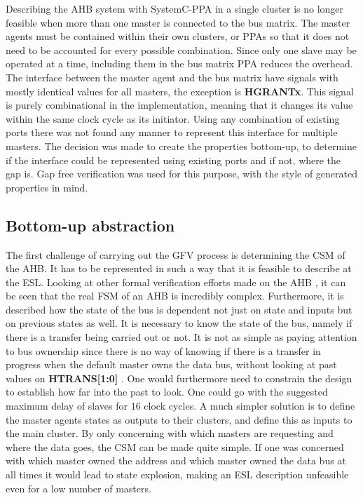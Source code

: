 Describing the AHB system with SystemC-PPA in a single cluster is no longer feasible when more than one master is connected to the bus matrix. The master agents must be contained within their own clusters, or PPAs so that it does not need to be accounted for every possible combination. Since only one slave may be operated at a time, including them in the bus matrix PPA reduces the overhead. The interface between the master agent and the bus matrix have signals with mostly identical values for all masters, the exception is \textbf{HGRANTx}. This signal is purely combinational in the implementation, meaning that it changes its value within the same clock cycle as its initiator. Using any combination of existing ports there was not found any manner to represent this interface for multiple masters. The decision was made to create the properties bottom-up, to determine if the interface could be represented using existing ports and if not, where the gap is. Gap free verification was used for this purpose, with the style of generated properties in mind. 

\subsection{Bottom-up abstraction}
The first challenge of carrying out the GFV process is determining the CSM of the AHB. It has to be represented in such a way that it is feasible to describe at the ESL. Looking at other formal verification efforts made on the AHB \cite{ahbformal}, it can be seen that the real FSM of an AHB is incredibly complex. 
 Furthermore, it is described how the state of the bus is dependent not just on state and inputs but on previous states as well. It is necessary to know the state of the bus, namely if there is a transfer being carried out or not. It is not as simple as paying attention to bus ownership since there is no way of knowing if there is a transfer in progress when the default master owns the data bus, without looking at past values on \textbf{HTRANS[1:0]} . One would furthermore need to constrain the design to establish how far into the past to look. One could go with the suggested maximum delay of slaves for 16 clock cycles. A much simpler solution is to define the master agents states as outputs to their clusters, and define this as inputs to the main cluster. By only concerning with which masters are requesting and where the data goes, the CSM can be made quite simple. If one was concerned with which master owned the address and which master owned the data bus at all times it would lead to state explosion, making an ESL description unfeasible even for a low number of masters.     

